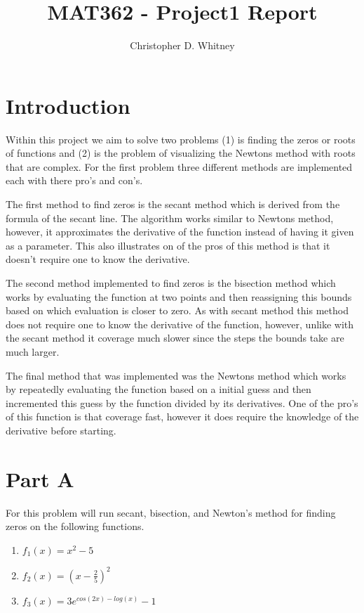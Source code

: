 \documentclass{article}
\begin{document}
\title{MAT362 - Project1 Report}
\author{Christopher D. Whitney}

\maketitle

\section*{Introduction}
Within this project we aim to solve two problems (1) is finding the zeros or roots of functions and (2) is the problem of visualizing the Newtons method with roots that are complex. For the first problem three different methods are implemented each with there pro's and con's. 

The first method to find zeros is the secant method which is derived from the formula of the secant line. The algorithm works similar to Newtons method, however, it approximates the derivative of the function instead of having it given as a parameter. This also illustrates on of the pros of this method is that it doesn't require one to know the derivative. 

The second method implemented to find zeros is the bisection method which works by evaluating the function at two points and then reassigning this bounds based on which evaluation is closer to zero. As with secant method this method does not require one to know the derivative of the function, however, unlike with the secant method it coverage much slower since the steps the bounds take are much larger. 

The final method that was implemented was the Newtons method which works by repeatedly evaluating the function based on a initial guess and then incremented this guess by the function divided by its derivatives. One of the pro's of this function is that coverage fast, however it does require the knowledge of the derivative before starting. 

\section*{Part A}

For this problem will run secant, bisection, and Newton's method for finding zeros on the following functions. 
\begin{enumerate}
	\item $ f_1 (x) = x^2 - 5$
	\item $ f_2 (x) = (x - \frac{2}{5	} ) ^ 2 $
	\item $ f_3 (x) = 3e^{cos(2x) - log(x)} - 1 $
\end{enumerate}
\end{document}
